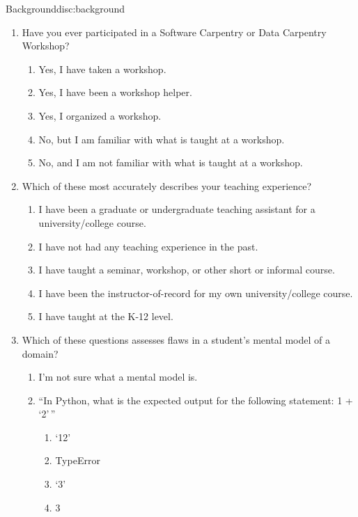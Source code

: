 \begin{discussion}{Background}{disc:background}

\begin{enumerate}

\item
  Have you ever participated in a Software Carpentry or Data Carpentry Workshop?

  \begin{enumerate}
  \item
    Yes, I have taken a workshop.
  \item
    Yes, I have been a workshop helper.
  \item
    Yes, I organized a workshop.
  \item
    No, but I am familiar with what is taught at a workshop.
  \item
    No, and I am not familiar with what is taught at a workshop.
  \end{enumerate}

\item
  Which of these most accurately describes your teaching experience?

  \begin{enumerate}
  \item
    I have been a graduate or undergraduate teaching assistant for a
    university/college course.
  \item
    I have not had any teaching experience in the past.
  \item
    I have taught a seminar, workshop, or other short or informal course.
  \item
    I have been the instructor-of-record for my own university/college
    course.
  \item
    I have taught at the K-12 level.
  \end{enumerate}

\item
  Which of these questions assesses flaws in a student's mental model of a domain?

  \begin{enumerate}
  \item
    I'm not sure what a mental model is.
  \item
    ``In Python, what is the expected output for the following statement:
    1 + `2'\,''
    \begin{enumerate}
    \item
      `12'
    \item
      TypeError
    \item
      `3'
    \item
      3
    \end{enumerate}


\end{enumerate}
\end{enumerate}
\end{discussion}
